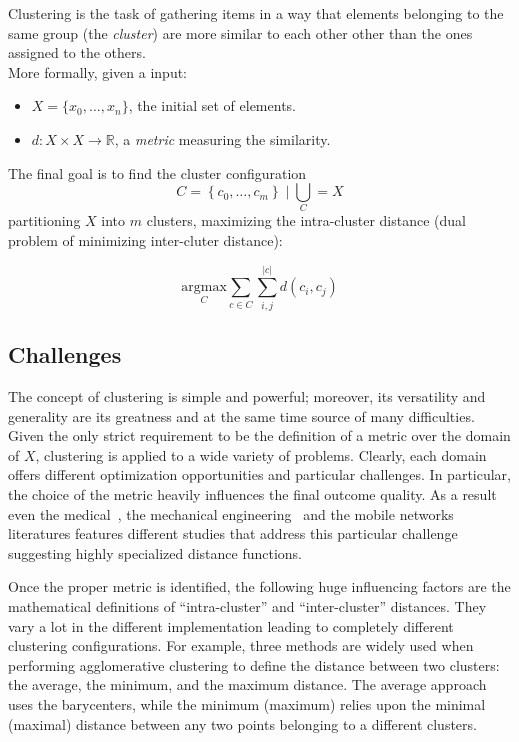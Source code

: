 \label{problem_definition}
Clustering is the task of gathering items in a way that elements belonging
to the same group (the \emph{cluster}) are more similar to each other other than the ones
assigned to the others.\\
More formally, given a input:
\begin{itemize}
    \item $X = \{x_0, \dots ,x_n\}$, the initial set of elements.
    \item $d: X \times X \to \mathbb{R}$, a \emph{metric} measuring the similarity.
\end{itemize}
The final goal is to find the cluster configuration
\begin{equation*}
    C = \left\{ c_0, \dots , c_m \right\} \mid \bigcup_{C} = X
\end{equation*}
partitioning $X$ into $m$ clusters, maximizing the intra-cluster distance
(dual problem of minimizing inter-cluter distance):

\begin{equation}
    \underset{C}{\mathrm{argmax}}
    \sum_{c \in C}
        \sum_{i,j}^{|c|}
            d(c_i,c_j)
\end{equation}


\subsection*{Challenges}
The concept of clustering is simple and powerful; moreover, its versatility
and generality are its greatness and at the same time source of many difficulties.
Given the only strict requirement to be the definition of a metric over the
domain of $X$, clustering is applied to a wide variety of problems.
Clearly, each domain offers different optimization opportunities and
particular challenges.
In particular, the choice of the metric heavily influences the final outcome quality.
As a result even the medical~\cite{siless2013comparison}, the mechanical
engineering~\cite{wilding2011clustering} and the mobile networks~\cite{cheng2009stability}
literatures features different studies that address this particular challenge
suggesting highly specialized distance functions.

Once the proper metric is identified, the following huge influencing factors
are the mathematical definitions of ``intra-cluster'' and ``inter-cluster''
distances. They vary a lot in the different implementation leading to
completely different clustering configurations.
For example, three methods are widely used when performing agglomerative
clustering to define the distance between two clusters:
the average, the minimum, and the maximum distance.
The average approach uses the barycenters, while the minimum (maximum)
relies upon the minimal (maximal) distance between any two points
belonging to a different clusters.


